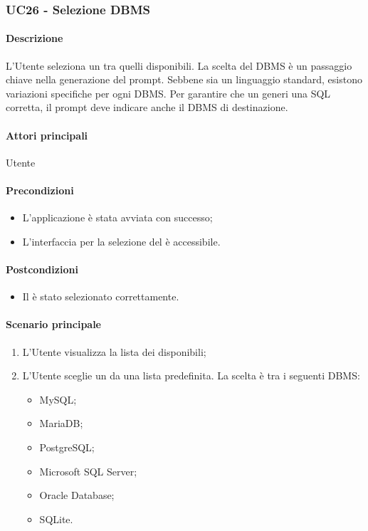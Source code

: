 \subsubsection{UC26 - Selezione DBMS}\label{UC26}

\paragraph*{Descrizione}
L'Utente seleziona un  tra quelli disponibili. La scelta del DBMS è un passaggio chiave nella generazione del prompt. Sebbene  sia un linguaggio standard, esistono variazioni specifiche per ogni DBMS. Per garantire che un  generi una  SQL corretta, il prompt deve indicare anche il DBMS di destinazione.

\paragraph*{Attori principali}
Utente

\paragraph*{Precondizioni}
\begin{itemize}
  \item L'applicazione è stata avviata con successo;
  \item L'interfaccia per la selezione del  è accessibile.
\end{itemize}

\paragraph*{Postcondizioni}
\begin{itemize}
  \item Il  è stato selezionato correttamente.
\end{itemize}

\paragraph*{Scenario principale}
\begin{enumerate}
  \item L'Utente visualizza la lista dei  disponibili;
  \item L'Utente sceglie un  da una lista predefinita. La scelta è tra i seguenti DBMS:
    \begin{itemize}
      \item MySQL;
      \item MariaDB;
      \item PostgreSQL;
      \item Microsoft SQL Server;
      \item Oracle Database;
      \item SQLite.
    \end{itemize} 
\end{enumerate}